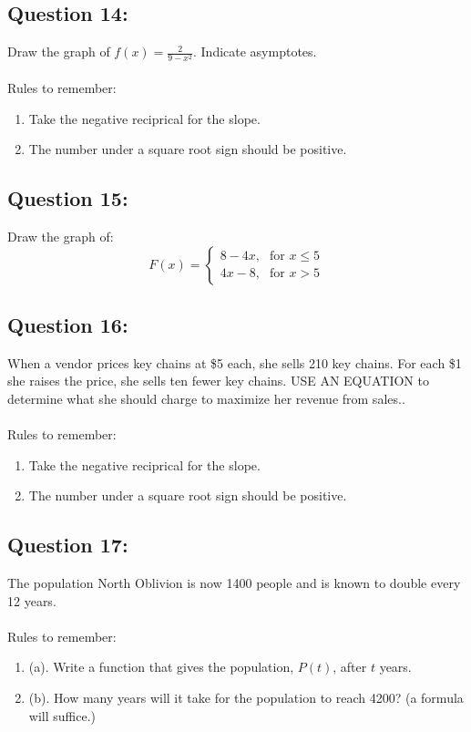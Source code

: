\documentclass[12pt, letterpaper]{article}
\begin{document}
\subsection{Question 14:}
  Draw the graph of $f(x)=\frac{2}{9-x^2}$. Indicate asymptotes.
  \\\\
  Rules to remember:
  \begin{enumerate}
    \item Take the negative reciprical for the slope.
    \item The number under a square root sign should be positive.
  \end{enumerate}

\subsection{Question 15:}
  Draw the graph of:
  \[F(x) =
    \begin{cases}
        \text{$8-4x$,} & \text{for $x\le 5$} \\
        \text{$4x-8$,} & \text{for $x>5$}
    \end{cases}\]

\subsection{Question 16:}
When a vendor prices key chains at \$5 each, she sells 210 key chains. For each \$1 she raises the price, she sells ten fewer key chains. USE AN EQUATION to determine what she should charge to maximize her revenue from sales..
  \\\\

  Rules to remember:
  \begin{enumerate}
    \item Take the negative reciprical for the slope.
    \item The number under a square root sign should be positive.
  \end{enumerate}

\subsection{Question 17:}
The population North Oblivion is now 1400 people and is known to double every 12 years.
  \\\\
 
  Rules to remember:
  \begin{enumerate}
      \item (a). Write a function that gives the population, $P(t)$, after $t$ years.
      \item (b). How many years will it take for the population to reach 4200? 
        (a formula will suffice.)
  \end{enumerate}
\end{document}
